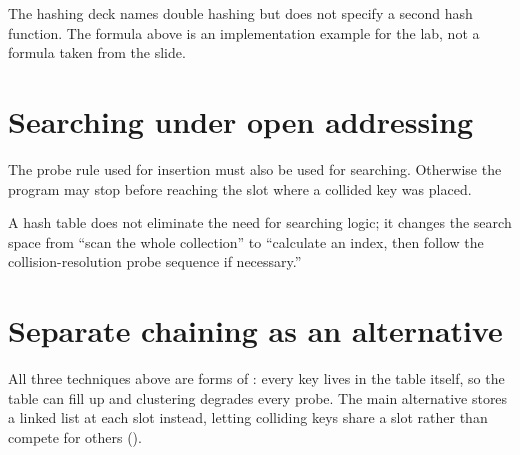 \begin{clarification}
The hashing deck names double hashing but does not specify a second hash function. The formula above is an implementation example for the lab, not a formula taken from the slide.
\end{clarification}

\section{Searching under open addressing}

The probe rule used for insertion must also be used for searching. Otherwise the program may stop before reaching the slot where a collided key was placed.

\begin{keyidea}
A hash table does not eliminate the need for searching logic; it changes the search space from ``scan the whole collection'' to ``calculate an index, then follow the collision-resolution probe sequence if necessary.''
\end{keyidea}

\section{Separate chaining as an alternative}

All three techniques above are forms of : every key lives in the table
itself, so the table can fill up and clustering degrades every probe. The main alternative
stores a linked list at each slot instead, letting colliding keys share a slot rather than
compete for others ().

